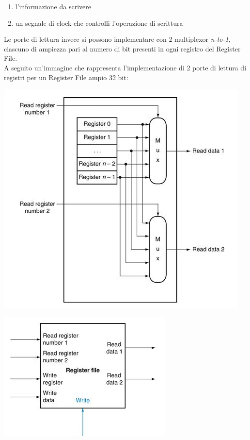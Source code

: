 \documentclass[a4paper,12pt, oneside]{book}
\begin{document}
\begin{itemize}
\begin{enumerate}
		      \item l'informazione da scrivere
		      \item un segnale di clock che controlli l'operazione di scrittura
	      \end{enumerate}
	      Le porte di lettura invece si possono implementare con 2 multiplexor \textit{n-to-1}, ciascuno di ampiezza pari al numero di bit presenti in ogni registro del Register File.
	      \\A seguito un'immagine che rappresenta l'implementazione di 2 porte di lettura di registri per un Register File ampio 32 bit:
	      \begin{center}
		      \includegraphics[scale=0.7]{img/reg2.png}
	      \end{center}
	      \newpage
	      \begin{center}
		      \includegraphics[scale=0.7]{img/reg1.png}\\

\end{center}
\end{itemize}
\end{document}

